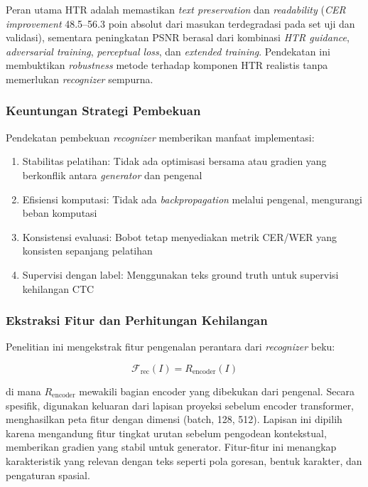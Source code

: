 \documentclass[journal]{IEEEtran}
\begin{document}
Peran utama HTR adalah memastikan \textit{text preservation} dan \textit{readability} (\textit{CER improvement} 48.5--56.3 poin absolut dari masukan terdegradasi pada set uji dan validasi), sementara peningkatan PSNR berasal dari kombinasi \textit{HTR guidance}, \textit{adversarial training}, \textit{perceptual loss}, dan \textit{extended training}. Pendekatan ini membuktikan \textit{robustness} metode terhadap komponen HTR realistis tanpa memerlukan \textit{recognizer} sempurna.

\subsubsection{Keuntungan Strategi Pembekuan}

Pendekatan pembekuan \textit{recognizer} memberikan manfaat implementasi:
\begin{enumerate}
    \item Stabilitas pelatihan: Tidak ada optimisasi bersama atau gradien yang berkonflik antara \textit{generator} dan pengenal
    \item Efisiensi komputasi: Tidak ada \textit{backpropagation} melalui pengenal, mengurangi beban komputasi
    \item Konsistensi evaluasi: Bobot tetap menyediakan metrik CER/WER yang konsisten sepanjang pelatihan
    \item Supervisi dengan label: Menggunakan teks ground truth untuk supervisi kehilangan CTC
\end{enumerate}

\subsubsection{Ekstraksi Fitur dan Perhitungan Kehilangan}

Penelitian ini mengekstrak fitur pengenalan perantara dari \textit{recognizer} beku:

\begin{equation}
\mathcal{F}_{\text{rec}}(I) = R_{\text{encoder}}(I)
\end{equation}

di mana $R_{\text{encoder}}$ mewakili bagian encoder yang dibekukan dari pengenal. Secara spesifik, digunakan keluaran dari lapisan proyeksi sebelum encoder transformer, menghasilkan peta fitur dengan dimensi (batch, 128, 512). Lapisan ini dipilih karena mengandung fitur tingkat urutan sebelum pengodean kontekstual, memberikan gradien yang stabil untuk generator. Fitur-fitur ini menangkap karakteristik yang relevan dengan teks seperti pola goresan, bentuk karakter, dan pengaturan spasial.
\end{document}
